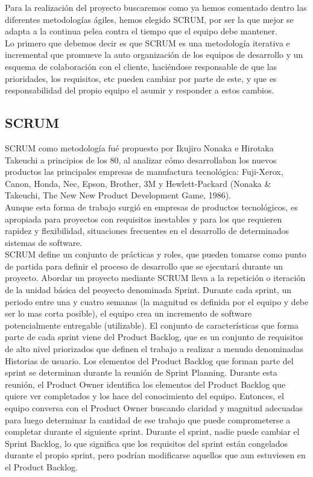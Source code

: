 \documentclass[../pfc.tex]{subfiles}
\begin{document}
	Para la realización del proyecto buscaremos como ya hemos comentado dentro las diferentes metodologías ágiles, hemos elegido SCRUM, por ser la que mejor se adapta a la continua pelea contra el tiempo que el equipo debe mantener. \\
	Lo primero que debemos decir es que SCRUM es una metodología iterativa e incremental que promueve la auto organización de los equipos de desarrollo y un esquema de colaboración con el cliente, haciéndose responsable de que las prioridades, los requisitos, etc pueden cambiar por parte de este, y que es responsabilidad del propio equipo el asumir y responder a estos cambios. 
	
	\subsection{SCRUM}
	
	SCRUM como metodología fué propuesto por Ikujiro Nonaka e Hirotaka Takeuchi a principios de los 80, al analizar cómo desarrollaban los nuevos productos las principales empresas de manufactura tecnológica: Fuji-Xerox, Canon, Honda, Nec, Epson, Brother, 3M y Hewlett-Packard (Nonaka \& Takeuchi, The New New Product Development Game, 1986).\\
	Aunque esta forma de trabajo surgió en empresas de productos tecnológicos, es apropiada para proyectos con requisitos inestables y para los que requieren rapidez y flexibilidad, situaciones frecuentes en el desarrollo de determinados sistemas de software.\\
	
	SCRUM define un conjunto de prácticas y roles, que pueden tomarse como punto de partida para definir el proceso de desarrollo que se ejecutará durante un proyecto. Abordar un proyecto mediante SCRUM lleva a la repetición o iteración de la unidad básica del peoyecto denominada Sprint. Durante cada sprint, un periodo entre una y cuatro semanas (la magnitud es definida por el equipo y debe ser lo mas corta posible), el equipo crea un incremento de software potencialmente entregable (utilizable). El conjunto de características que forma parte de cada sprint viene del Product Backlog, que es un conjunto de requisitos de alto nivel priorizados que definen el trabajo a realizar a menudo denominadas Historias de usuario. Los elementos del Product Backlog que forman parte del sprint se determinan durante la reunión de Sprint Planning. Durante esta reunión, el Product Owner identifica los elementos del Product Backlog que quiere ver completados y los hace del conocimiento del equipo. Entonces, el equipo conversa con el Product Owner buscando claridad y magnitud adecuadas para luego determinar la cantidad de ese trabajo que puede comprometerse a completar durante el siguiente sprint. Durante el sprint, nadie puede cambiar el Sprint Backlog, lo que significa que los requisitos del sprint están congelados durante el propio sprint, pero podrían modificarse aquellos que aun estuviesen en el Product Backlog.\\
	
\end{document}
